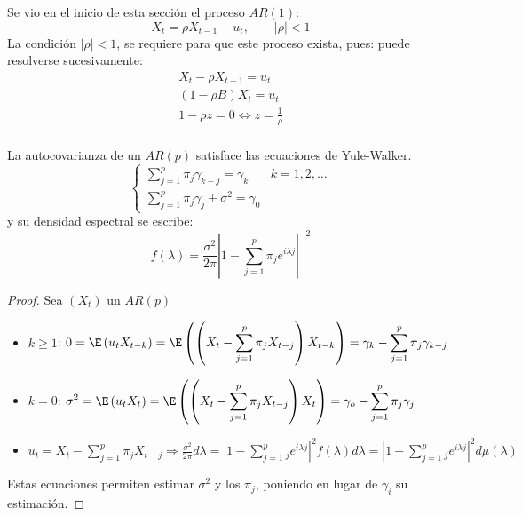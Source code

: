 \begin{ejemplo}
 Se vio en el inicio de esta secci\'{o}n el proceso $AR(1)$:
\[
X_{t} =\rho X_{t-1} +u_{t} ,\qquad \left| \rho \right|<1
\]
La condici\'{o}n $\left| \rho \right|<1$, se requiere para que este proceso exista, pues: puede resolverse sucesivamente:
\begin{gather*}
 X_{t} -\rho X_{t-1} =u_{t} \\ 
 \left( {1-\rho B} \right)X_{t} =u_{t} \\ 
 1-\rho z=0 \Longleftrightarrow z=\frac{1}{\rho } \\ 
\end{gather*}
\end{ejemplo}

\begin{teorema}
 La autocovarianza de un $AR(p)$ satisface las ecuaciones de Yule-Walker.
\[
\begin{cases}
 \displaystyle\sum_{j=1}^p {\pi_{j} \gamma_{k-j} } =\gamma_{k} & k=1,2,\ldots\\
 \displaystyle\sum_{j=1}^p {\pi_{j} \gamma_{j} +\sigma^{2}=\gamma_{0} }
\end{cases}
\]
y su densidad espectral se escribe:
\[
f\left( \lambda \right)=\frac{\sigma^{2}}{2\pi }\left| {1-\sum_{j=1}^p {\pi_{j} e^{i\lambda j}} } \right|^{-2}
\]
\end{teorema}

\begin{proof}
Sea $\left( {X_{t} } \right)$ un $AR (p)$
\begin{itemize}
\item $k\ge 1$: $\displaystyle 0=\E\left( {u_{t} X_{t-k} } \right)=\E\left( {\left( {X_{t} -\sum_{j=1}^p {\pi_{j} X_{t-j} } } \right)X_{t-k} } \right)=\gamma_{k} -\sum_{j=1}^p {\pi_{j} \gamma_{k-j} } $ 

\item $k=0$: $\displaystyle\sigma^{2}=\E\left( {u_{t} X_{t} } \right)=\E\left( {\left( {X_{t} -\sum_{j=1}^p {\pi_{j} X_{t-j} } } \right)X_{t} } \right)=\gamma_{o} -\sum_{j=1}^p {\pi_{j} \gamma_{j} } $

\item $\displaystyle u_{t} =X_{t} -\sum_{j=1}^p {\pi_{j} X_{t-j} \Rightarrow \frac{\sigma^{2}}{2\pi }d\lambda =\left| {1-\sum_{j=1}^p {_{j} e^{i\lambda j}} } \right|^{2}} f(\lambda )d\lambda =\left| {1-\sum_{j=1}^p {_{j} e^{i\lambda j}} } \right|^{2}d\mu \left( \lambda \right)$
\end{itemize}

Estas ecuaciones permiten estimar $\sigma^{2}$ y los $\pi_{j} $, poniendo en lugar de $\gamma_{i} $ su estimaci\'{o}n.
\end{proof}


